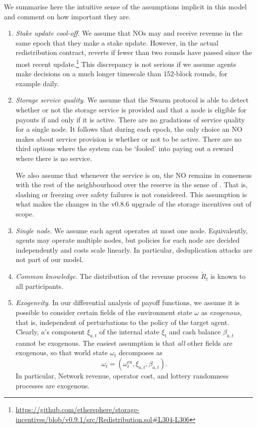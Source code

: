 We summarise here the intuitive sense of the assumptions implicit in this model and comment on how important they are.

\begin{enumerate}
  \item \emph{Stake update cool-off}. %
    We assume that NOs may  and receive revenue in the same epoch that they make a stake update.
    However, in the actual redistribution contract,  reverts if fewer than two rounds have passed since the most recent update.\footnote{\url{https://github.com/ethersphere/storage-incentives/blob/v0.9.1/src/Redistribution.sol\#L304-L306}}
    This discrepancy is not serious if we assume agents make decisions on a much longer timescale than 152-block rounds, for example daily.

  \item \emph{Storage service quality}. %
    We assume that the Swarm protocol is able to detect whether or not the storage service is provided and that a node is eligible for payouts if and only if it is active.
    There are no gradations of service quality for a single node.
    It follows that during each epoch, the only choice an NO makes about service provision is whether or not to be active.
    There are no third options where the system can be `fooled' into paying out a reward where there is no service.
    
    We also assume that whenever the service is on, the NO remains in consensus with the rest of the neighbourhood over the reserve in the sense of \cite[\S3.4.4]{book-of-swarm}.
    That is, slashing or freezing over safety failures is not considered.
    This assumption is what makes the changes in the v0.8.6 upgrade of the storage incentives out of scope.

  \item \emph{Single node}.
    We assume each agent operates at most one node.
    Equivalently, agents may operate multiple nodes, but policies for each node are decided independently and costs scale linearly.
    In particular, deduplication attacks are not part of our model.

  \item \emph{Common knowledge}.
    The distribution of the revenue process $\tilde{R}_t$ is known to all participants.

  \item \emph{Exogeneity}.
    In our differential analysis of payoff functions, we assume it is possible to consider certain fields of the environment state $\omega$ as \emph{exogenous}, that is, independent of perturbations to the policy of the target agent.
    Clearly, $a$'s component $\xi_{a,t}$ of the internal state $\xi_t$ and cash balance $\beta_{a,t}$ cannot be exogenous.
    The easiest assumption is that \emph{all} other fields are exogenous, so that world state $\omega_t$ decomposes as
    \[
      \omega_t = (\omega_t^\mathrm{ex},\xi_{a,t},\beta_{a,t}).
    \]
    In particular, Network revenue, operator cost, and lottery randomness processes are exogenous.


\end{enumerate}
